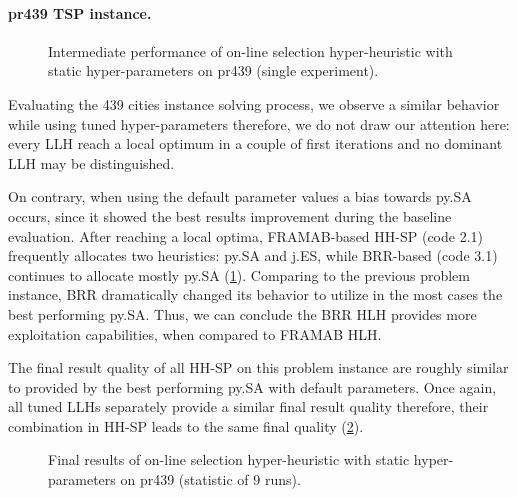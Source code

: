 \newpage
\paragraph{pr439 TSP instance.}
\begin{figure}[t]
	\centering
	\vspace{-20pt}
	
	\caption{Intermediate performance of on-line selection hyper-heuristic with static hyper-parameters on pr439 (single experiment).}
	\vspace{-10pt}
	\label{eval:pict:hh-sp:pr439 intermediate}
\end{figure}
Evaluating the 439 cities instance solving process, we observe a similar behavior while using tuned hyper-parameters therefore, we do not draw our attention here: every LLH reach a local optimum in a couple of first iterations and no dominant LLH may be distinguished.

On contrary, when using the default parameter values a bias towards py.SA occurs, since it showed the best results improvement during the baseline evaluation. After reaching a local optima, FRAMAB-based HH-SP (code 2.1) frequently allocates two heuristics: py.SA and j.ES, while BRR-based (code 3.1) continues to allocate mostly py.SA (\cref{eval:pict:hh-sp:pr439 intermediate}). Comparing to the previous problem instance, BRR dramatically changed its behavior to utilize in the most cases the best performing py.SA. Thus, we can conclude the BRR HLH provides more exploitation capabilities, when compared to FRAMAB HLH.

The final result quality of all HH-SP on this problem instance are roughly similar to provided by the best performing py.SA with default parameters. Once again, all tuned LLHs separately provide a similar final result quality therefore, their combination in HH-SP leads to the same final quality (\cref{eval:pict:hh-sp:pr439 final}).

\begin{figure}[b]
	\centering
	\vspace{-20pt}
	
	\caption{Final results of on-line selection hyper-heuristic with static hyper-parameters on pr439 (statistic of 9 runs).}
	\vspace{-5pt}
	\label{eval:pict:hh-sp:pr439 final}
\end{figure}

\newpage
